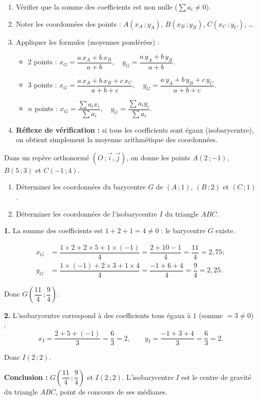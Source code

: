 \documentclass[11pt]{article}
\begin{document}
\begin{methode}
\begin{enumerate}
\item Vérifier que la somme des coefficients est non nulle ($\sum a_i \neq 0$).
\item Noter les coordonnées des points : $A(x_A\,;y_A)$, $B(x_B\,;y_B)$, $C(x_C\,;y_C)$, \dots
\item Appliquer les formules (moyennes pondérées) :
\begin{itemize}
\item 2 points : $x_G=\dfrac{a\,x_A+b\,x_B}{a+b},\quad y_G=\dfrac{a\,y_A+b\,y_B}{a+b}$.
\item 3 points : $x_G=\dfrac{a\,x_A+b\,x_B+c\,x_C}{a+b+c},\quad y_G=\dfrac{a\,y_A+b\,y_B+c\,y_C}{a+b+c}$.
\item $n$ points : $x_G=\dfrac{\sum a_i x_i}{\sum a_i},\quad y_G=\dfrac{\sum a_i y_i}{\sum a_i}$.
\end{itemize}
\item \textbf{Réflexe de vérification :} si tous les coefficients sont égaux (isobarycentre), on obtient simplement la moyenne arithmétique des coordonnées.
\end{enumerate}
\end{methode}

\begin{exoresolu}
Dans un repère orthonormé $(O\,;\vec{i},\vec{j})$, on donne les points $A(2\,;-1)$, $B(5\,;3)$ et $C(-1\,;4)$.
\begin{enumerate}
\item Déterminer les coordonnées du barycentre $G$ de $(A\,;1)$, $(B\,;2)$ et $(C\,;1)$.
\item Déterminer les coordonnées de l'isobarycentre $I$ du triangle $ABC$.
\end{enumerate}
\tcblower
\textbf{1.} La somme des coefficients est $1+2+1=4\neq 0$ : le barycentre $G$ existe.

\begin{align*}
x_G&=\dfrac{1\times 2+2\times 5+1\times (-1)}{4}=\dfrac{2+10-1}{4}=\dfrac{11}{4}=2{,}75 ;\\[4pt]
y_G&=\dfrac{1\times (-1)+2\times 3+1\times 4}{4}=\dfrac{-1+6+4}{4}=\dfrac{9}{4}=2{,}25.
\end{align*}

Donc $G\left(\dfrac{11}{4}\,;\dfrac{9}{4}\right)$.

\textbf{2.} L'isobarycentre correspond à des coefficients tous égaux à $1$ (somme $=3\neq 0$) :
\[ x_I=\dfrac{2+5+(-1)}{3}=\dfrac{6}{3}=2, \qquad y_I=\dfrac{-1+3+4}{3}=\dfrac{6}{3}=2. \]

Donc $I(2\,;2)$.

\textbf{Conclusion :} $G\left(\dfrac{11}{4}\,;\dfrac{9}{4}\right)$ et $I(2\,;2)$. L'isobarycentre $I$ est le centre de gravité du triangle $ABC$, point de concours de ses médianes.
\end{exoresolu}
\end{document}
